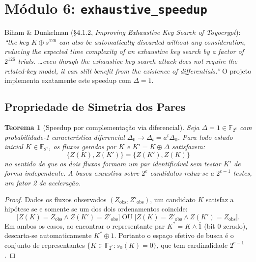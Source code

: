 \documentclass[12pt,a4paper]{article}
\newtheorem{theorem}{Teorema}[section]
\theoremstyle{definition}
\theoremstyle{remark}
\newcommand{\GF}[1]{\mathbb{F}_{2^{#1}}}
\newcommand{\xor}{\oplus}
\newcommand{\AND}{\wedge}
\begin{document}
\section{Módulo 6: \texttt{exhaustive\_speedup}}
\label{sec:speedup}

\begin{paperref}
  Biham \& Dunkelman (\S4.1.2, \textit{Improving Exhaustive Key Search of
  Toyocrypt}): \textit{``the key $K \xor s^{126}$ can also be automatically
  discarded without any consideration, reducing the expected time complexity
  of an exhaustive key search by a factor of $2^{126}$ trials. \ldots even
  though the exhaustive key search attack does not require the related-key
  model, it can still benefit from the existence of differentials.''}
  O projeto implementa exatamente este speedup com $\Delta = 1$.
\end{paperref}

\subsection{Propriedade de Simetria dos Pares}

\begin{theorem}[Speedup por complementação via diferencial]
  \label{thm:speedup}
  Seja $\Delta = 1 \in \GF{e}$ com probabilidade-1 característica diferencial
  $\Delta_0 \to \Delta_t = a^t \Delta_0$. Para todo estado inicial $K \in
  \GF{e}$, os fluxos gerados por $K$ e $K' = K \xor \Delta$ satisfazem:
  \[
    \{Z(K), Z(K')\} = \{Z(K'), Z(K)\}
  \]
  no sentido de que os dois fluxos formam um \emph{par identificável} sem
  testar $K'$ de forma independente. A busca exaustiva sobre $2^e$ candidatos
  reduz-se a $2^{e-1}$ testes, um fator 2 de aceleração.
\end{theorem}

\begin{proof}
  Dados os fluxos observados $(Z_{\text{obs}}, Z'_{\text{obs}})$, um
  candidato $K$ satisfaz a hipótese se e somente se um dos dois
  ordenamentos coincide:
  \[
    \bigl[Z(K) = Z_{\text{obs}} \AND Z(K') = Z'_{\text{obs}}\bigr]
    \;\text{OU}\;
    \bigl[Z(K) = Z'_{\text{obs}} \AND Z(K') = Z_{\text{obs}}\bigr].
  \]
  Em ambos os casos, ao encontrar o representante par $K^* = K \AND
  \overline{1}$ (bit 0 zerado), descarta-se automaticamente $K^* \xor 1$.
  Portanto o espaço efetivo de busca é o conjunto de representantes
  $\{K \in \GF{e} : s_0(K) = 0\}$, que tem cardinalidade $2^{e-1}$.
\end{proof}
\end{document}
